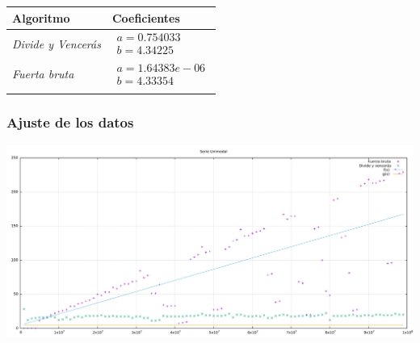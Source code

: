 \documentclass[compress]{beamer}
\begin{document}
\begin{frame}
	\begin{center}
	\begin{tabular}{ll}
	Algoritmo & Coeficientes\\ \hline\noalign{\smallskip}
	\textit{Divide y Vencerás} & $\begin{array}{ll}
	a = 0.754033 \\
b = 4.34225 
\end{array}$ \\\hline\noalign{\smallskip}
	\textit{Fuerta bruta} & $\begin{array}{ll}
	a = 1.64383e-06 \\
b = 4.33354

\end{array}$ \\\hline\noalign{\smallskip}
\end{tabular}
\end{center}
\end{frame}

\begin{frame}
  \frametitle{Ajuste de los datos}
  \begin{center}
  \includegraphics[scale=0.23]{ajuste.pdf}
\end{center}
\end{frame}
\end{document}
